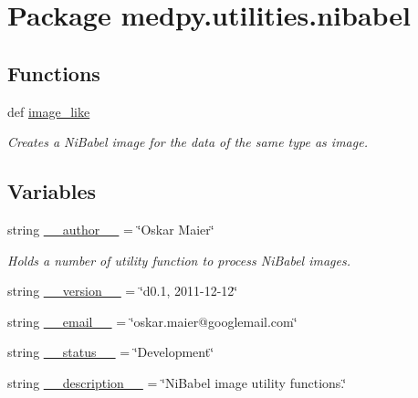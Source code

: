 \hypertarget{namespacemedpy_1_1utilities_1_1nibabel}{
\section{Package medpy.utilities.nibabel}
\label{namespacemedpy_1_1utilities_1_1nibabel}
}
\subsection*{Functions}
\begin{DoxyCompactItemize}
\item 
def \hyperlink{namespacemedpy_1_1utilities_1_1nibabel_ae7edf0d24f91a07cd744a32b5768c9b3}{image\_\-like}
\begin{DoxyCompactList}\small\item\em Creates a NiBabel image for the data of the same type as image. \end{DoxyCompactList}\end{DoxyCompactItemize}
\subsection*{Variables}
\begin{DoxyCompactItemize}
\item 
string \hyperlink{namespacemedpy_1_1utilities_1_1nibabel_aefad48e608c1f77a365a959cb01abebf}{\_\-\_\-author\_\-\_\-} = \char`\"{}Oskar Maier\char`\"{}
\begin{DoxyCompactList}\small\item\em Holds a number of utility function to process NiBabel images. \end{DoxyCompactList}\item 
string \hyperlink{namespacemedpy_1_1utilities_1_1nibabel_aef564d622a872d4a5724f34f5167d0f6}{\_\-\_\-version\_\-\_\-} = \char`\"{}d0.1, 2011-\/12-\/12\char`\"{}
\item 
string \hyperlink{namespacemedpy_1_1utilities_1_1nibabel_a91134bb125f3b3ce85dbc67f73edafa3}{\_\-\_\-email\_\-\_\-} = \char`\"{}oskar.maier@googlemail.com\char`\"{}
\item 
string \hyperlink{namespacemedpy_1_1utilities_1_1nibabel_ad6d46ba600da8eb4276c1c1d1cc45990}{\_\-\_\-status\_\-\_\-} = \char`\"{}Development\char`\"{}
\item 
string \hyperlink{namespacemedpy_1_1utilities_1_1nibabel_aed62d192744122f84ec7eeec74c6936c}{\_\-\_\-description\_\-\_\-} = \char`\"{}NiBabel image utility functions.\char`\"{}
\end{DoxyCompactItemize}


